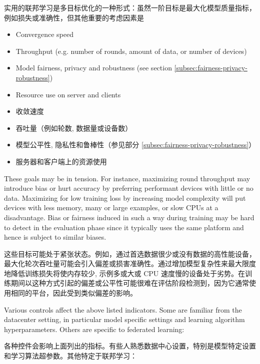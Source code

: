 实用的联邦学习是多目标优化的一种形式：虽然一阶目标是最大化模型质量指标，例如损失或准确性，但其他重要的考虑因素是

\begin{itemize}
    \item Convergence speed
    \item Throughput (e.g. number of rounds, amount of data, or number of devices)
    \item Model fairness, privacy and robustness (see section \ref{subsec:fairness-privacy-robustness})
    \item Resource use on server and clients
\end{itemize}
\begin{itemize}
    \item  收敛速度
    \item 吞吐量（例如轮数, 数据量或设备数）
    \item 模型公平性, 隐私性和鲁棒性（参见部分 \ref{subsec:fairness-privacy-robustness}）
    \item 服务器和客户端上的资源使用
\end{itemize}

These goals may be in tension. For instance, maximizing round throughput may introduce bias or hurt accuracy by preferring performant devices with little or no data. Maximizing for low training loss by increasing model complexity will put devices with less memory, many or large examples, or slow CPUs at a disadvantage. Bias or fairness induced in such a way during training may be hard to detect in the evaluation phase since it typically uses the same platform and hence is subject to similar biases.

这些目标可能处于紧张状态。例如，通过首选数据很少或没有数据的高性能设备，最大化轮次吞吐量可能会引入偏差或损害准确性。通过增加模型复杂性来最大限度地降低训练损失将使内存较少, 示例多或大或 CPU 速度慢的设备处于劣势。在训练期间以这种方式引起的偏差或公平性可能很难在评估阶段检测到，因为它通常使用相同的平台，因此受到类似偏差的影响。

Various controls affect the above listed indicators. Some are familiar from the datacenter setting, in particular model specific settings and learning algorithm hyperparameters. Others are specific to federated learning:

各种控件会影响上面列出的指标。有些人熟悉数据中心设置，特别是模型特定设置和学习算法超参数。其他特定于联邦学习：


